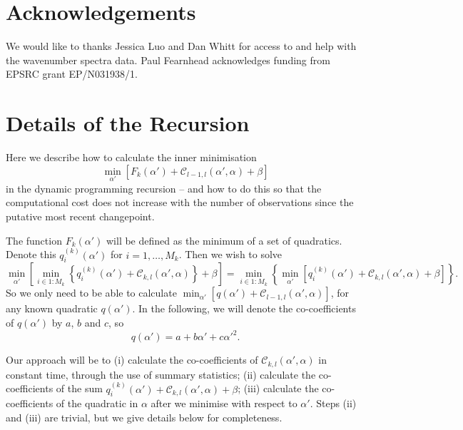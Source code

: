 \documentclass[nojss]{jss}
\begin{document}
\section{Acknowledgements}
We would like to thanks Jessica Luo and Dan Whitt for access to and help with the wavenumber spectra data. Paul Fearnhead acknowledges funding from EPSRC grant EP/N031938/1.


%


\appendix

\section{Details of the Recursion} \label{App:cost_update}

Here we describe how to calculate the inner minimisation
\[
\min_{\alpha'} \left[
F_{k}(\alpha')+\mathcal{C}_{l-1,l}(\alpha',\alpha) +\beta
\right]
\]
in the dynamic programming recursion -- and how to do this so that the computational cost does not increase with the number of observations since the putative most recent changepoint.

The function $F_k(\alpha')$ will be defined as the minimum of a set of quadratics. Denote this $q^{(k)}_i(\alpha')$ for $i=1,\ldots,M_k$. Then we wish to solve
\[
\min_{\alpha'} \left[ \min_{i\in1:M_k} \left\{
q_{i}^{(k)}(\alpha')+\mathcal{C}_{k,l}(\alpha',\alpha)\right\} +\beta
\right] =
\min_{i\in 1:M_k}\left\{
\min_{\alpha'} \left[
q_{i}^{(k)}(\alpha')+\mathcal{C}_{k,l}(\alpha',\alpha) + \beta
\right]
\right\}.
\]
So we only need to be able to calculate $\min_{\alpha'} [q(\alpha')+\mathcal{C}_{l-1,l}(\alpha',\alpha)]$, for any known quadratic $q(\alpha')$. In the following, we will denote the co-coefficients of $q(\alpha')$ by $a$, $b$ and $c$, so
\[
q(\alpha')=a+b\alpha' + c\alpha'^2.
\]

Our approach will be to (i)  calculate the co-coefficients of $\mathcal{C}_{k,l}(\alpha',\alpha)$ in constant time, through the use of summary statistics; (ii) calculate the co-coefficients of the sum $q_{i}^{(k)}(\alpha')+\mathcal{C}_{k,l}(\alpha',\alpha) + \beta$; (iii) calculate the co-coefficients of the quadratic in $\alpha$ after we minimise with respect to $\alpha'$. Steps (ii) and (iii) are trivial, but we give details below for completeness.
\end{document}
